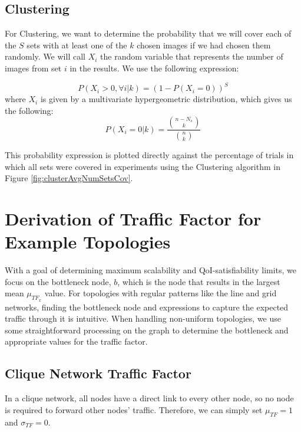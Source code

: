 
\subsection{Clustering}
For Clustering, we want to determine the probability that we will cover each of the $S$ sets with at least one of the $k$ chosen images if we had chosen them randomly.  We will call $X_i$ the random variable that represents the number of images from set $i$ in the results.  We use the following expression:

\begin{equation}
	P( X_i > 0 , \forall i | k) = (1 - P(X_i = 0))^{S}
\end{equation}
where $X_i$ is given by a multivariate hypergeometric distribution, which gives us the following:
\begin{equation}
	P(X_i = 0 | k) = \frac{{n-N_s \choose k}}{{n \choose k}}
\end{equation}

This probability expression is plotted directly against the percentage of trials in which all sets were covered in experiments using the Clustering algorithm in Figure \ref{fig:clusterAvgNumSetsCov}.


\section{Derivation of Traffic Factor for Example Topologies}
\label{sec:derivation_TFs}

With a goal of determining maximum scalability and QoI-satisfiability limits, we focus on the bottleneck node, $b$, which is the node that results in the largest mean $\mu_{TF_x}$ value. For topologies with regular patterns like the line and grid networks, finding the bottleneck node and expressions to capture the expected traffic through it is intuitive. When handling non-uniform topologies, we use some straightforward processing on the graph to determine the bottleneck and appropriate values for the traffic factor.

\subsection{Clique Network Traffic Factor}
In a clique network, all nodes have a direct link to every other node, so no node is required to forward other nodes' traffic.  Therefore, we can simply set $\mu_{TF} = 1$ and $\sigma_{TF} = 0$.

